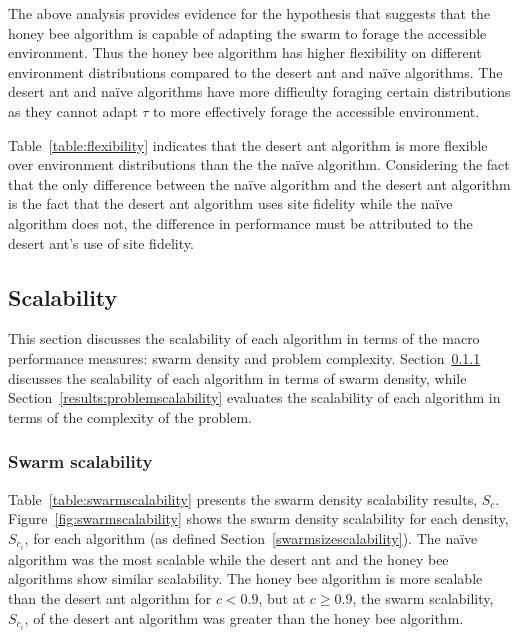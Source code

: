 \documentclass[preprint,12pt]{elsarticle}
\begin{document}
The above analysis provides evidence for the hypothesis that suggests that the honey bee algorithm is capable of adapting the swarm to forage the accessible environment. Thus the honey bee algorithm has higher flexibility on different environment distributions compared to the desert ant and na\"ive algorithms. The desert ant and na\"ive algorithms have more difficulty foraging certain distributions as they cannot adapt $\tau$ to more effectively forage the accessible environment.

Table~\ref{table:flexibility} indicates that the desert ant algorithm is more flexible over environment distributions than the the na\"ive algorithm. Considering the fact that the only difference between the na\"ive algorithm and the desert ant algorithm is the fact that the desert ant algorithm uses site fidelity while the na\"ive algorithm does not, the difference in performance must be attributed to the desert ant's use of site fidelity. %

\subsection{Scalability}
\label{results:scalability}

This section discusses the scalability of each algorithm in terms of the macro performance measures: swarm density and problem complexity. Section~\ref{results:swarmscalability} discusses the scalability of each algorithm in terms of swarm density, while Section~\ref{results:problemscalability} evaluates the scalability of each algorithm in terms of the complexity of the problem.

\subsubsection{Swarm scalability}
\label{results:swarmscalability}

Table~\ref{table:swarmscalability} presents the swarm density scalability results, $S_c$. Figure~\ref{fig:swarmscalability} shows the swarm density scalability for each density, $S_{c_i}$, for each algorithm (as defined Section~\ref{swarmsizescalability}). The na\"ive algorithm was the most scalable while the desert ant and the honey bee algorithms show similar scalability. The honey bee algorithm is more scalable than the desert ant algorithm for $c < 0.9$, but at $c \geq 0.9$, the swarm scalability, $S_{c_i}$, of the desert ant algorithm was greater than the honey bee algorithm.
\end{document}
